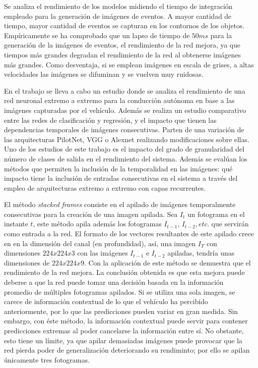 Se analiza el rendimiento de los modelos midiendo el tiempo de integración empleado para la generación de imágenes de eventos. A mayor cantidad de tiempo, mayor cantidad de eventos se capturan en los contornos de los objetos. Empíricamente se ha comprobado que un lapso de tiempo de $ 50 ms $ para la generación de la imágenes de eventos, el rendimiento de la red mejora, ya que tiempos más grandes degradan el rendimiento de la red al obtenerse imágenes más grandes. Como desventaja, si se emplean imágenes en escala de grises, a altas velocidades las imágenes se difuminan y se vuelven muy ruidosas.

En el trabajo \cite{pixels} se lleva a cabo un estudio donde se analiza el rendimiento de una red neuronal extremo a extremo para la conducción autónoma en base a las imágenes capturadas por el vehículo. Además se realiza un estudio comparativo entre las redes de clasificación y regresión, y el impacto que tienen las dependencias temporales de imágenes consecutivas. Parten de una variación de las arquitecturas PilotNet, VGG o Alexnet realizando modificaciones sobre ellas. Uno de los estudios de este trabajo es el impacto del grado de granularidad del número de clases de salida en el rendimiento del sistema. Además se evalúan los métodos que permiten la inclusión de la temporalidad en las imágenes: qué impacto tiene la inclusión de entradas consecutivas en el sistema a través del empleo de arquitecturas extremo a extremo con capas recurrentes.

El método \textit{stacked frames} consiste en el apilado de imágenes temporalmente consecutivas para la creación de una imagen apilada. Sea $I_t$ un fotograma en el instante $t$, este método apila además los fotogramas $I_{t-1}$, $I_{t-2}, etc.$ que servirán como entrada a la red. El formato de los vectores resultantes de este apilado crece en en la dimensión del canal (en profundidad), así, una imagen $I_T$ con dimensiones $224x224x3$ con las imágenes $I_{t-1}$ e $I_{t-2}$ apiladas, tendría unas dimensiones de $224x224x9$. Con la aplicación de este método se demuestra que el rendimiento de la red mejora. La conclusión obtenida es que esta mejora puede deberse a que la red puede tomar una decisión basada en la información promedio de múltiples fotogramas apilados. Si se utiliza una sola imagen, se carece de información contextual de lo que el vehículo ha percibido anteriormente, por lo que las predicciones pueden variar en gran medida. Sin embargo, con éste método, la información contextual puede servir para contener predicciones extremas al poder cancelarse la información entre sí. No obstante, esto tiene un límite, ya que apilar demasiadas imágenes puede provocar que la red pierda poder de generalización deteriorando su rendiminto; por ello se apilan únicamente tres fotogramas.


